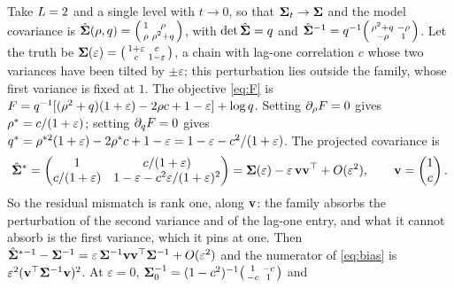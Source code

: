 \begin{example}
\label{ex:projection}
Take $L=2$ and a single level with $t\to0$, so that $\mathbf{\Sigma}_t\to\mathbf{\Sigma}$ and the
model covariance is $\hat{\mathbf{\Sigma}}(\rho,q)=\begin{psmallmatrix}1&\rho\\ \rho&\rho^2+q\end{psmallmatrix}$,
with $\det\hat{\mathbf{\Sigma}}=q$ and
$\hat{\mathbf{\Sigma}}^{-1}=q^{-1}\begin{psmallmatrix}\rho^2+q&-\rho\\-\rho&1\end{psmallmatrix}$.
Let the truth be $\mathbf{\Sigma}(\varepsilon)=\begin{psmallmatrix}1+\varepsilon&c\\ c&1-\varepsilon\end{psmallmatrix}$,
a chain with lag-one correlation $c$ whose two variances have been tilted by
$\pm\varepsilon$; this perturbation lies outside the family, whose first variance is
fixed at $1$. The objective \cref{eq:F} is
$F=q^{-1}[(\rho^2+q)(1+\varepsilon)-2\rho c+1-\varepsilon]+\log q$.
Setting $\partial_\rho F=0$ gives $\rho^\ast=c/(1+\varepsilon)$; setting
$\partial_q F=0$ gives $q^\ast=\rho^{\ast2}(1+\varepsilon)-2\rho^\ast c+1-\varepsilon=1-\varepsilon-c^2/(1+\varepsilon)$.
The projected covariance is
\begin{equation}
  \hat{\mathbf{\Sigma}}^\ast=\begin{pmatrix}1&c/(1+\varepsilon)\\ c/(1+\varepsilon)&1-\varepsilon-c^2\varepsilon/(1+\varepsilon)^2\end{pmatrix}
  =\mathbf{\Sigma}(\varepsilon)-\varepsilon\,\mathbf{v}\mathbf{v}^\top+O(\varepsilon^2),\qquad\mathbf{v}=\begin{pmatrix}1\\ c\end{pmatrix}.
\end{equation}
So the residual mismatch is rank one, along $\mathbf{v}$: the family absorbs the
perturbation of the second variance and of the lag-one entry, and what it cannot absorb
is the first variance, which it pins at one. Then
$\hat{\mathbf{\Sigma}}^{\ast-1}-\mathbf{\Sigma}^{-1}=\varepsilon\,\mathbf{\Sigma}^{-1}\mathbf{v}\mathbf{v}^\top\mathbf{\Sigma}^{-1}+O(\varepsilon^2)$ and
the numerator of \cref{eq:bias} is $\varepsilon^2(\mathbf{v}^\top\mathbf{\Sigma}^{-1}\mathbf{v})^2$. At
$\varepsilon=0$, $\mathbf{\Sigma}_0^{-1}=(1-c^2)^{-1}\begin{psmallmatrix}1&-c\\-c&1\end{psmallmatrix}$ and

\end{example}
